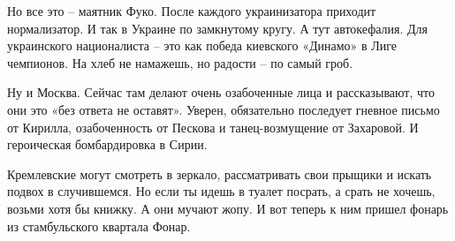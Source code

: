 Но все это – маятник Фуко. После каждого украинизатора приходит нормализатор. И
так в Украине по замкнутому кругу. А тут автокефалия. Для украинского
националиста – это как победа киевского «Динамо» в Лиге чемпионов. На хлеб не
намажешь, но радости – по самый гроб.

Ну и Москва. Сейчас там делают очень озабоченные лица и рассказывают, что они
это «без ответа не оставят». Уверен, обязательно последует гневное письмо от
Кирилла, озабоченность от Пескова и танец-возмущение от Захаровой. И
героическая бомбардировка в Сирии.

Кремлевские могут смотреть в зеркало, рассматривать свои прыщики и искать
подвох в случившемся. Но если ты идешь в туалет посрать, а срать не хочешь,
возьми хотя бы книжку. А они мучают жопу. И вот теперь к ним пришел фонарь из
стамбульского квартала Фонар.

